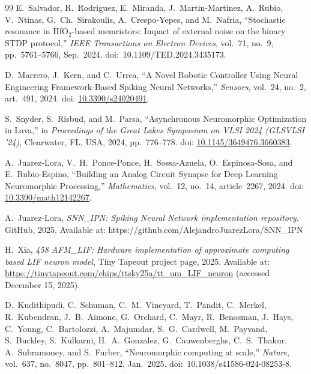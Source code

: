 \documentclass[letter, 12pt]{article}
\begin{document}
\begin{thebibliography}{99}
E.~Salvador, R.~Rodriguez, E.~Miranda, J.~Martin-Martinez, A.~Rubio,
V.~Ntinas, G.~Ch.~Sirakoulis, A.~Crespo-Yepes, and M.~Nafria,
\newblock ``Stochastic resonance in HfO$_2$-based memristors: Impact of external noise on the binary STDP protocol,''
\newblock \emph{IEEE Transactions on Electron Devices}, vol.~71, no.~9,
pp.~5761--5766, Sep.~2024.
\newblock doi:~10.1109/TED.2024.3435173.


D.~Marrero, J.~Kern, and C.~Urrea,
``A Novel Robotic Controller Using Neural Engineering Framework-Based Spiking Neural Networks,''
\emph{Sensors}, vol.~24, no.~2, art.~491, 2024.
doi: \href{https://doi.org/10.3390/s24020491}{10.3390/s24020491}.

S.~Snyder, S.~Risbud, and M.~Parsa,
``Asynchronous Neuromorphic Optimization in Lava,''
in \emph{Proceedings of the Great Lakes Symposium on VLSI 2024 (GLSVLSI '24)}, 
Clearwater, FL, USA, 2024, pp.~776--778.
doi: \href{https://doi.org/10.1145/3649476.3660383}{10.1145/3649476.3660383}.


A.~Juarez-Lora, V.~H.~Ponce-Ponce, H.~Sossa-Azuela, O.~Espinosa-Sosa, and E.~Rubio-Espino,
``Building an Analog Circuit Synapse for Deep Learning Neuromorphic Processing,''
\textit{Mathematics},
vol.~12, no.~14, article~2267, 2024.
doi: \href{https://doi.org/10.3390/math12142267}{10.3390/math12142267}.

A.~Juarez-Lora, \emph{SNN\_IPN: Spiking Neural Network implementation repository}. GitHub, 2025. Available at: https://github.com/AlejandroJuarezLora/SNN\_IPN


H.~Xia,
\newblock \emph{458 AFM\_LIF: Hardware implementation of approximate computing based LIF neuron model},
\newblock Tiny Tapeout project page, 2025.
\newblock Available at: \url{https://tinytapeout.com/chips/ttsky25a/tt_um_LIF_neuron}
\newblock (accessed December 15, 2025).


D.~Kudithipudi, C.~Schuman, C.~M.~Vineyard, T.~Pandit, C.~Merkel, R.~Kubendran,
J.~B.~Aimone, G.~Orchard, C.~Mayr, R.~Benosman, J.~Hays, C.~Young,
C.~Bartolozzi, A.~Majumdar, S.~G.~Cardwell, M.~Payvand, S.~Buckley,
S.~Kulkarni, H.~A.~Gonzalez, G.~Cauwenberghs, C.~S.~Thakur,
A.~Subramoney, and S.~Furber,
\newblock ``Neuromorphic computing at scale,''
\newblock \emph{Nature}, vol.~637, no.~8047, pp.~801--812, Jan.~2025.
\newblock doi:~10.1038/s41586-024-08253-8.



\end{thebibliography}
\end{document}

